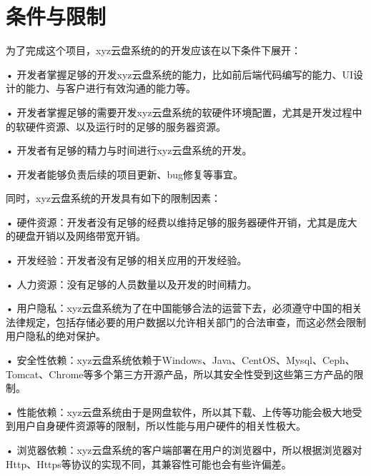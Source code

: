 \section{条件与限制}
为了完成这个项目，xyz云盘系统的的开发应该在以下条件下展开：

• 开发者掌握足够的开发xyz云盘系统的能力，比如前后端代码编写的能力、UI设计的能力、与客户进行有效沟通的能力等。

• 开发者掌握足够的需要开发xyz云盘系统的软硬件环境配置，尤其是开发过程中的软硬件资源、以及运行时的足够的服务器资源。
 
• 开发者有足够的精力与时间进行xyz云盘系统的开发。

• 开发者能够负责后续的项目更新、bug修复等事宜。

同时，xyz云盘系统的开发具有如下的限制因素：

• 硬件资源：开发者没有足够的经费以维持足够的服务器硬件开销，尤其是庞大的硬盘开销以及网络带宽开销。

• 开发经验：开发者没有足够的相关应用的开发经验。

• 人力资源：没有足够的人员数量以及开发的时间精力。

• 用户隐私：xyz云盘系统为了在中国能够合法的运营下去，必须遵守中国的相关法律规定，包括存储必要的用户数据以允许相关部门的合法审查，而这必然会限制用户隐私的绝对保护。

• 安全性依赖：xyz云盘系统依赖于Windows、Java、CentOS、Mysql、Ceph、Tomcat、Chrome等多个第三方开源产品，所以其安全性受到这些第三方产品的限制。

• 性能依赖：xyz云盘系统由于是网盘软件，所以其下载、上传等功能会极大地受到用户自身硬件资源等的限制，所以性能与用户硬件的相关性极大。

• 浏览器依赖：xyz云盘系统的客户端部署在用户的浏览器中，所以根据浏览器对Http、Https等协议的实现不同，其兼容性可能也会有些许偏差。
